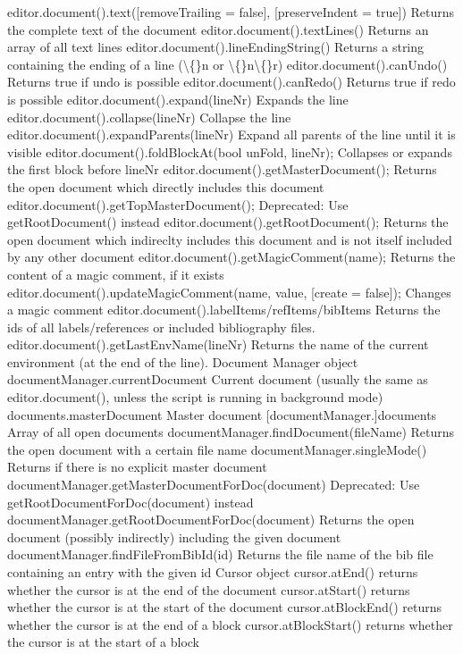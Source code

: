 \documentclass{article}
\begin{document}
	editor.document().text([removeTrailing = false], [preserveIndent = true])	Returns the complete text of the document
	editor.document().textLines()	Returns an array of all text lines
	editor.document().lineEndingString()	Returns a string containing the ending of a line (\textbackslash\{\}n or \textbackslash\{\}n\textbackslash\{\}r)
	editor.document().canUndo()	Returns true if undo is possible
	editor.document().canRedo()	Returns true if redo is possible
	editor.document().expand(lineNr)	Expands the line
	editor.document().collapse(lineNr)	Collapse the line
	editor.document().expandParents(lineNr)	Expand all parents of the line until it is visible
	editor.document().foldBlockAt(bool unFold, lineNr);	Collapses or expands the first block before lineNr
	editor.document().getMasterDocument();	Returns the open document which directly includes this document
	editor.document().getTopMasterDocument();	Deprecated: Use getRootDocument() instead
	editor.document().getRootDocument();	Returns the open document which indireclty includes this document and is not itself included by any other document
	editor.document().getMagicComment(name);	Returns the content of a magic comment, if it exists
	editor.document().updateMagicComment(name, value, [create = false]);	Changes a magic comment
	editor.document().labelItems/refItems/bibItems	Returns the ids of all labels/references or included bibliography files.
	editor.document().getLastEnvName(lineNr)	Returns the name of the current environment (at the end of the line).
	Document Manager object
	documentManager.currentDocument	Current document (usually the same as editor.document(), unless the script is running in background mode)
	documents.masterDocument	Master document
	[documentManager.]documents	Array of all open documents
	documentManager.findDocument(fileName)	Returns the open document with a certain file name
	documentManager.singleMode()	Returns if there is no explicit master document
	documentManager.getMasterDocumentForDoc(document)	Deprecated: Use getRootDocumentForDoc(document) instead
	documentManager.getRootDocumentForDoc(document)	Returns the open document (possibly indirectly) including the given document
	documentManager.findFileFromBibId(id)	Returns the file name of the bib file containing an entry with the given id
	Cursor object
	cursor.atEnd()	returns whether the cursor is at the end of the document
	cursor.atStart()	returns whether the cursor is at the start of the document
	cursor.atBlockEnd()	returns whether the cursor is at the end of a block
	cursor.atBlockStart()	returns whether the cursor is at the start of a block
\end{document}
